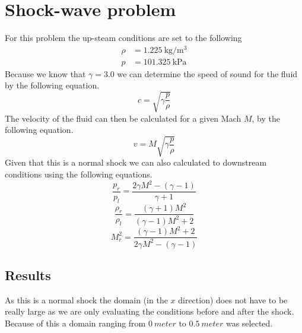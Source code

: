 \documentclass[paper=a4, fontsize=12pt]{scrartcl}
\begin{document}
\section{Shock-wave problem}
For this problem the up-steam conditions are set to the following
\begin{align*}
        \rho &= \SI{1.225}{\kilogram \per \meter^3}\\
        p &= \SI{101.325}{\kilo \pascal}
\end{align*}
Because we know that $\gamma = 3.0$ we can determine the speed of sound for the fluid by the following
equation.
\[
        c= \sqrt{\gamma \frac{p}{\rho}}
\]
The velocity of the fluid can then be calculated for a given Mach $M$, by the following equation.
\[
v = M \sqrt{\gamma \frac{p}{\rho}}
\]
Given that this is a normal shock we can also calculated to downstream conditions using the following
equations.
\[
        \frac{p_r}{p_l} = \frac{2 \gamma M^2 - (\gamma-1)}{\gamma+1}
\]
\[
        \frac{\rho_r}{\rho_l} = \frac{(\gamma+1)M^2}{(\gamma-1)M^2 +2}
\]
\[
        M_r^2= \frac{(\gamma -1)M^2 +2}{2\gamma M^2-(\gamma-1)}
\]
\subsection{Results}
As this is a normal shock the domain (in the $x$ direction) does not have to be really large as we are only
evaluating the conditions before and after the shock.
Because of this a domain ranging from $\SI{0}{meter}$ to $\SI{0.5}{meter}$ was selected.
\end{document}

